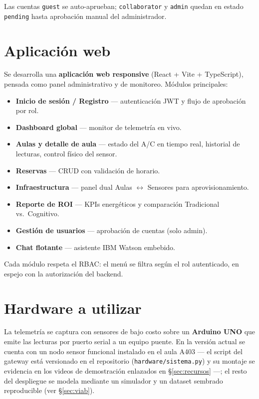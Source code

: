\documentclass[11pt,a4paper]{article}
\begin{document}
Las cuentas \texttt{guest} se auto-aprueban; \texttt{collaborator} y
\texttt{admin} quedan en estado \texttt{pending} hasta aprobación manual del
administrador.

\section{Aplicación web}

Se desarrolla una \textbf{aplicación web responsive} (React + Vite +
TypeScript), pensada como panel administrativo y de monitoreo. Módulos
principales:

\begin{itemize}
\item \textbf{Inicio de sesión / Registro} --- autenticación JWT y flujo de
aprobación por rol.
\item \textbf{Dashboard global} --- monitor de telemetría en vivo.
\item \textbf{Aulas y detalle de aula} --- estado del A/C en tiempo real,
historial de lecturas, control físico del sensor.
\item \textbf{Reservas} --- CRUD con validación de horario.
\item \textbf{Infraestructura} --- panel dual Aulas $\leftrightarrow$ Sensores
para aprovisionamiento.
\item \textbf{Reporte de ROI} --- KPIs energéticos y comparación
Tradicional vs.\ Cognitivo.
\item \textbf{Gestión de usuarios} --- aprobación de cuentas (solo admin).
\item \textbf{Chat flotante} --- asistente IBM Watson embebido.
\end{itemize}

Cada módulo respeta el RBAC: el menú se filtra según el rol autenticado, en
espejo con la autorización del backend.

\section{Hardware a utilizar}

La telemetría se captura con sensores de bajo costo sobre un
\textbf{Arduino UNO} que emite las lecturas por puerto serial a un equipo
puente. En la versión actual se cuenta con un nodo sensor funcional instalado
en el aula A403 --- el script del gateway está versionado en el repositorio
(\texttt{hardware/sistema.py}) y su montaje se evidencia en los videos de
demostración enlazados en §\ref{sec:recursos} ---; el resto del despliegue se
modela mediante un simulador y un dataset sembrado reproducible
(ver §\ref{sec:viab}).
\end{document}
